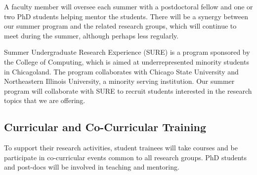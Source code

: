 \documentclass[11pt]{NSFamsart}
\newcommand{\FredNote}[1]{{\color{blue} Fred: #1}}
\begin{document}
A faculty member will oversee each summer with a postdoctoral fellow and one or two PhD students helping mentor the students.  There will be a synergy between our summer program and the related research groups, which will continue to meet during the summer, although perhaps less regularly.

Summer Undergraduate Research Experience (SURE) is a program sponsored by the College of Computing, which is aimed at underrepresented minority students in Chicagoland.  The program collaborates with Chicago State University and Northeastern Illinois University, a minority serving institution.  Our summer program will collaborate with SURE to recruit students interested in the research topics that we are offering.
 
 




\subsection{Curricular and Co-Curricular Training}
To support their research activities, student trainees will take courses and be participate in co-curricular events common to all research groups.  PhD students and post-docs will be involved in teaching and mentoring. 
\end{document}
